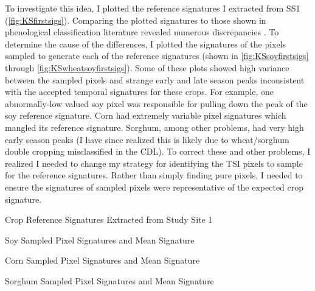 To investigate this idea, I plotted the reference signatures I extracted from SS1 (\autoref{fig:KSfirstsigs}). Comparing the plotted signatures to those shown in phenological classification literature  revealed numerous discrepancies \autocites{wardlow2002discriminating}{wardlow2005state-level}{wardlow2007analysis}{wardlow2008large-area}{masialeti2010a-comparative}. To determine the cause of the differences, I plotted the signatures of the pixels sampled to generate each of the reference signatures (shown in \autoref{fig:KSsoyfirstsigs} through \autoref{fig:KSwheatsoyfirstsigs}). Some of these plots showed high variance between the sampled pixels and strange early and late season peaks inconsistent with the accepted temporal signatures for these crops. For example, one abnormally-low valued soy pixel was responsible for pulling down the peak of the soy reference signature. Corn had extremely variable pixel signatures which mangled its reference signature. Sorghum, among other problems, had very high early season peaks (I have since realized this is likely due to wheat/sorghum double cropping misclassified in the CDL). To correct these and other problems, I realized I needed to change my strategy for identifying the TSI pixels to sample for the reference signatures. Rather than simply finding pure pixels, I needed to ensure the signatures of sampled pixels were representative of the expected crop signature.

\begin{ssfigure}
  \centering
  
  \caption{Crop Reference Signatures Extracted from Study Site 1}
  \label{fig:KSfirstsigs}
\end{ssfigure}

\begin{ssfigure}
  \centering
  
  \caption{Soy Sampled Pixel Signatures and Mean Signature}
    \label{fig:KSsoyfirstsigs}
\end{ssfigure}

\begin{ssfigure}
  \centering
  
  \caption{Corn Sampled Pixel Signatures and Mean Signature}
    \label{fig:KScornfirstsigs}
\end{ssfigure}

\begin{ssfigure}
  \centering
  
  \caption{Sorghum Sampled Pixel Signatures and Mean Signature}
    \label{fig:KSsorghumfirstsigs}
\end{ssfigure}

